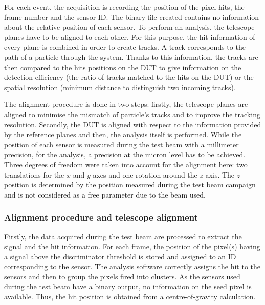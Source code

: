     For each event, the acquisition is recording the position of the pixel hits, the frame number and the sensor ID.
    The binary file created contains no information about the relative position of each sensor.
    To perform an analysis, the telescope planes have to be aligned to each other.
    For this purpose, the hit information of every plane is combined in order to create tracks. 
    A track corresponds to the path of a particle through the system.
    Thanks to this information, the tracks are then compared to the hits positions on the \gls{DUT} to give information on the detection efficiency (the ratio of tracks matched to the hits on the \gls{DUT}) or the spatial resolution (minimum distance to distinguish two incoming tracks).

    The alignment procedure is done in two steps: firstly, the telescope planes are aligned to minimise the mismatch of particle's tracks and to improve the tracking resolution.
    Secondly, the \gls{DUT} is aligned with respect to the information provided by the reference planes and then, the analysis itself is performed.
    While the position of each sensor is measured during the test beam with a millimeter precision, for the analysis, a precision at the micron level has to be achieved.
    Three degrees of freedom were taken into account for the alignment here: two translations for the $x$ and $y$-axes and one rotation around the $z$-axis.
    The $z$ position is determined by the position measured during the test beam campaign and is not considered as a free parameter due to the beam used.

      \subsubsection{Alignment procedure and telescope alignment}

      Firstly, the data acquired during the test beam are processed to extract the signal and the hit information.
      For each frame, the position of the pixel(s) having a signal above the discriminator threshold is stored and assigned to an ID corresponding to the sensor.
      The analysis software correctly assigns the hit to the sensors and then to group the pixels fired into clusters.
      As the sensors used during the test beam have a binary output, no information on the seed pixel is available.
      Thus, the hit position is obtained from a centre-of-gravity calculation.

